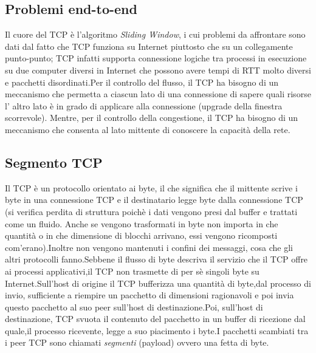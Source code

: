 \subsection{Problemi end-to-end}
Il cuore del TCP è l'algoritmo \textit{Sliding Window}, i cui problemi da affrontare sono dati dal fatto che TCP funziona su Internet piuttosto che su un collegamente punto-punto; TCP infatti supporta connessione logiche tra processi in esecuzione su due computer diversi in Internet che possono avere tempi di RTT molto diversi e pacchetti disordinati.Per il controllo del flusso, il TCP ha bisogno di un meccanismo che permetta a ciascun lato di una connessione di sapere quali risorse l’ altro lato è in grado di applicare alla connessione (upgrade della finestra scorrevole). Mentre, per il controllo della congestione, il TCP ha bisogno di un meccanismo che consenta al lato mittente di conoscere la capacità della rete.
\subsection{Segmento TCP}
Il TCP è un protocollo orientato ai byte, il che significa che il mittente scrive i byte in una connessione TCP e il destinatario legge byte dalla connessione TCP (si verifica perdita di struttura poichè i dati vengono presi dal buffer e trattati come un fluido. Anche se vengono trasformati in byte non importa in che quantità o in che dimensione di blocchi arrivano, essi vengono ricomposti com'erano).Inoltre non vengono mantenuti i confini dei messaggi, cosa che gli altri protocolli fanno.Sebbene il flusso di byte descriva il servizio che il TCP offre ai processi applicativi,il TCP non trasmette di per sè singoli byte su Internet.Sull'host di origine il TCP bufferizza una quantità di byte,dal processo di invio, sufficiente a riempire un pacchetto di dimensioni ragionavoli e poi invia questo pacchetto al suo peer sull'host di destinazione.Poi, sull'host di destinazione, TCP svuota il contenuto del pacchetto in un buffer di ricezione dal quale,il processo ricevente, legge a suo piacimento i byte.I pacchetti scambiati tra i peer TCP sono chiamati \textit{segmenti} (payload) ovvero una fetta di byte. \\


